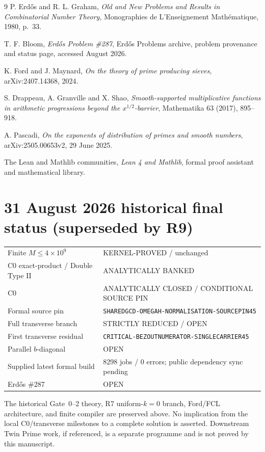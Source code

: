 \documentclass[11pt]{article}
\theoremstyle{definition}
\newcommand{\1}{\mathbf 1}
\newcommand{\status}[1]{\textsf{#1}}
\begin{document}
\begin{thebibliography}{9}
P. Erd\H{o}s and R. L. Graham,
\emph{Old and New Problems and Results in Combinatorial Number Theory},
Monographies de L'Enseignement Math\'ematique, 1980, p.~33.

T. F. Bloom,
\emph{Erd\H{o}s Problem \#287}, Erd\H{o}s Problems archive,
problem provenance and status page, accessed August 2026.

K. Ford and J. Maynard,
\emph{On the theory of prime producing sieves},
arXiv:2407.14368, 2024.

S. Drappeau, A. Granville and X. Shao,
\emph{Smooth-supported multiplicative functions in arithmetic progressions beyond the
$x^{1/2}$-barrier}, Mathematika 63 (2017), 895--918.

A. Pascadi,
\emph{On the exponents of distribution of primes and smooth numbers},
arXiv:2505.00653v2, 29 June 2025.

The Lean and Mathlib communities,
\emph{Lean 4 and Mathlib}, formal proof assistant and mathematical library.
\end{thebibliography}

\section*{31 August 2026 historical final status (superseded by R9)}
\begin{center}
\small
\begin{tabular}{ll}
\toprule
Finite $M\le4\times10^9$ & \status{KERNEL-PROVED / unchanged}\\
C0 exact-product / Double Type II & \status{ANALYTICALLY BANKED}\\
C0 & \status{ANALYTICALLY CLOSED / CONDITIONAL SOURCE PIN}\\
Formal source pin & \texttt{SHAREDGCD-OMEGAH-NORMALISATION-SOURCEPIN45}\\
Full transverse branch & \status{STRICTLY REDUCED / OPEN}\\
First transverse residual & \texttt{CRITICAL-BEZOUTNUMERATOR-SINGLECARRIER45}\\
Parallel $b$-diagonal & \status{OPEN}\\
Supplied latest formal build & \status{8298 jobs / 0 errors; public dependency sync pending}\\
Erd\H{o}s \#287 & \status{OPEN}\\
\bottomrule
\end{tabular}
\end{center}

The historical Gate~0--2 theory, R7 uniform-$k=0$ branch, Ford/FCL architecture, and finite
compiler are preserved above. No implication from the local C0/transverse milestones to a
complete solution is asserted. Downstream Twin Prime work, if referenced, is a separate
programme and is not proved by this manuscript.
\end{document}
